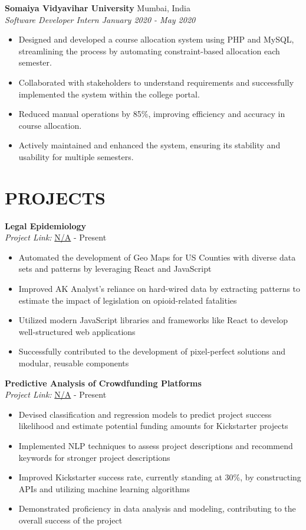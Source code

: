 \documentclass[a4paper,9pt]{extarticle}
\begin{document}
    \noindent
    \textbf{Somaiya Vidyavihar University} \hfill Mumbai, India\\
    \textit{{Software Developer Intern} \hfill January 2020 - May 2020}
    \begin{itemize}
    \item {Designed and developed a course allocation system using PHP and MySQL, streamlining the process by automating constraint-based allocation each semester.}\item {Collaborated with stakeholders to understand requirements and successfully implemented the system within the college portal.}\item {Reduced manual operations by 85\%, improving efficiency and accuracy in course allocation.}\item {Actively maintained and enhanced the system, ensuring its stability and usability for multiple semesters.}\end{itemize}\section*{PROJECTS}
        \noindent
        \textbf{Legal Epidemiology}\\
        \textit{Project Link:} \url{N/A} \hfill  - Present
        \begin{itemize}
        \item {Automated the development of Geo Maps for US Counties with diverse data sets and patterns by leveraging React and JavaScript}\item {Improved AK Analyst's reliance on hard-wired data by extracting patterns to estimate the impact of legislation on opioid-related fatalities}\item {Utilized modern JavaScript libraries and frameworks like React to develop well-structured web applications}\item {Successfully contributed to the development of pixel-perfect solutions and modular, reusable components}\end{itemize}
        \noindent
        \textbf{Predictive Analysis of Crowdfunding Platforms}\\
        \textit{Project Link:} \url{N/A} \hfill  - Present
        \begin{itemize}
        \item {Devised classification and regression models to predict project success likelihood and estimate potential funding amounts for Kickstarter projects}\item {Implemented NLP techniques to assess project descriptions and recommend keywords for stronger project descriptions}\item {Improved Kickstarter success rate, currently standing at 30\%, by constructing APIs and utilizing machine learning algorithms}\item {Demonstrated proficiency in data analysis and modeling, contributing to the overall success of the project}\end{itemize}
\end{document}
